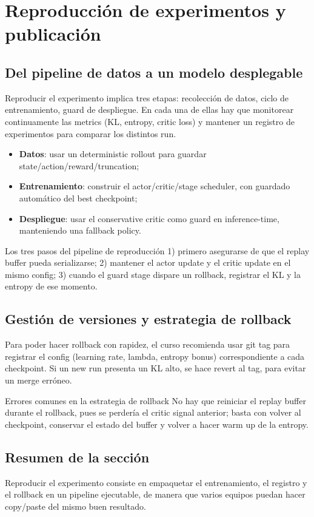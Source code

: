 \section{Reproducción de experimentos y publicación}

\subsection{Del pipeline de datos a un modelo desplegable}

Reproducir el experimento implica tres etapas: recolección de datos, ciclo de entrenamiento, guard de despliegue. En cada una de ellas hay que monitorear continuamente las metrics (KL, entropy, critic loss) y mantener un registro de experimentos para comparar los distintos run.

\begin{itemize}
    \item \textbf{Datos}: usar un deterministic rollout para guardar state/action/reward/truncation;
    \item \textbf{Entrenamiento}: construir el actor/critic/stage scheduler, con guardado automático del best checkpoint;
    \item \textbf{Despliegue}: usar el conservative critic como guard en inference-time, manteniendo una fallback policy.
\end{itemize}

\begin{importantbox}{Los tres pasos del pipeline de reproducción}
1) primero asegurarse de que el replay buffer pueda serializarse; 2) mantener el actor update y el critic update en el mismo config; 3) cuando el guard stage dispare un rollback, registrar el KL y la entropy de ese momento.
\end{importantbox}

\subsection{Gestión de versiones y estrategia de rollback}

Para poder hacer rollback con rapidez, el curso recomienda usar git tag para registrar el config (learning rate, lambda, entropy bonus) correspondiente a cada checkpoint. Si un new run presenta un KL alto, se hace revert al tag, para evitar un merge erróneo.

\begin{warningbox}{Errores comunes en la estrategia de rollback}
No hay que reiniciar el replay buffer durante el rollback, pues se perdería el critic signal anterior; basta con volver al checkpoint, conservar el estado del buffer y volver a hacer warm up de la entropy.
\end{warningbox}

\subsection{Resumen de la sección}

Reproducir el experimento consiste en empaquetar el entrenamiento, el registro y el rollback en un pipeline ejecutable, de manera que varios equipos puedan hacer copy/paste del mismo buen resultado.

